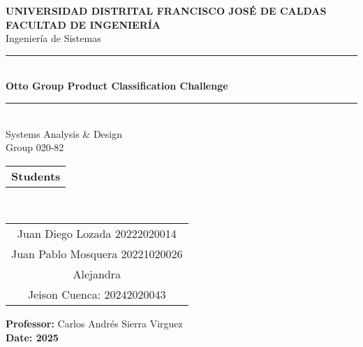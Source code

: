 \documentclass[12pt]{article}%
\begin{document}
\begin{center}

    {\Large \textbf{UNIVERSIDAD DISTRITAL FRANCISCO JOSÉ DE CALDAS}}\\[1cm]%
    {\large \textbf{FACULTAD DE INGENIERÍA}}\\%
    {\large Ingeniería de Sistemas}\\[2cm]

    \rule{\textwidth}{0.4pt}\\[0.8cm]
    {\Large \textbf{Otto Group Product Classification Challenge}}\\[0.8cm]

    \rule{\textwidth}{0.4pt}\\[2cm]

    {\Large Systems Analysis \& Design}\\[1cm]
    {\large Group 020-82}\\[2.5cm]

    \begin{tabular}{>{\bfseries}c}%
        Students \\

    \end{tabular}\\[1cm]

    \begin{tabular}{c}
        Juan Diego Lozada 20222020014\\
        Juan Pablo Mosquera 20221020026 \\
        Alejandra \\
        Jeison Cuenca: 20242020043 \\
    \end{tabular}
    \vfill %

    \textbf{Professor:} Carlos Andrés Sierra Virguez \\[1cm]
    \textbf{Date: 2025} 
    
\end{center}
\end{document}
